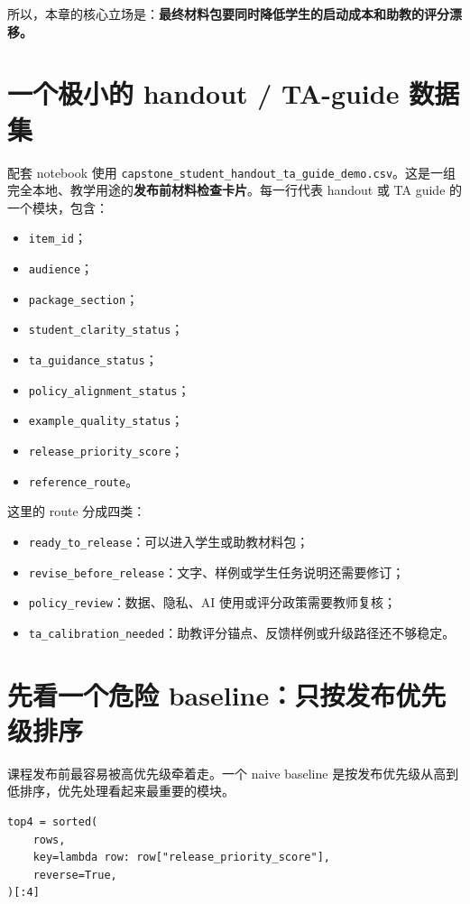 所以，本章的核心立场是：\textbf{最终材料包要同时降低学生的启动成本和助教的评分漂移。}

\section{一个极小的 handout / TA-guide 数据集}

配套 notebook 使用 \nolinkurl{capstone_student_handout_ta_guide_demo.csv}。这是一组完全本地、教学用途的\textbf{发布前材料检查卡片}。每一行代表 handout 或 TA guide 的一个模块，包含：

\begin{itemize}
    \item \texttt{item\_id}；
    \item \texttt{audience}；
    \item \texttt{package\_section}；
    \item \texttt{student\_clarity\_status}；
    \item \texttt{ta\_guidance\_status}；
    \item \texttt{policy\_alignment\_status}；
    \item \texttt{example\_quality\_status}；
    \item \texttt{release\_priority\_score}；
    \item \texttt{reference\_route}。
\end{itemize}

这里的 route 分成四类：

\begin{itemize}
    \item \texttt{ready\_to\_release}：可以进入学生或助教材料包；
    \item \texttt{revise\_before\_release}：文字、样例或学生任务说明还需要修订；
    \item \texttt{policy\_review}：数据、隐私、AI 使用或评分政策需要教师复核；
    \item \texttt{ta\_calibration\_needed}：助教评分锚点、反馈样例或升级路径还不够稳定。
\end{itemize}

\section{先看一个危险 baseline：只按发布优先级排序}

课程发布前最容易被高优先级牵着走。一个 naive baseline 是按发布优先级从高到低排序，优先处理看起来最重要的模块。

\begin{examplebox}[只按发布优先级取前四个模块]
\begin{lstlisting}[style=pythonstyle]
top4 = sorted(
    rows,
    key=lambda row: row["release_priority_score"],
    reverse=True,
)[:4]
\end{lstlisting}
\end{examplebox}

